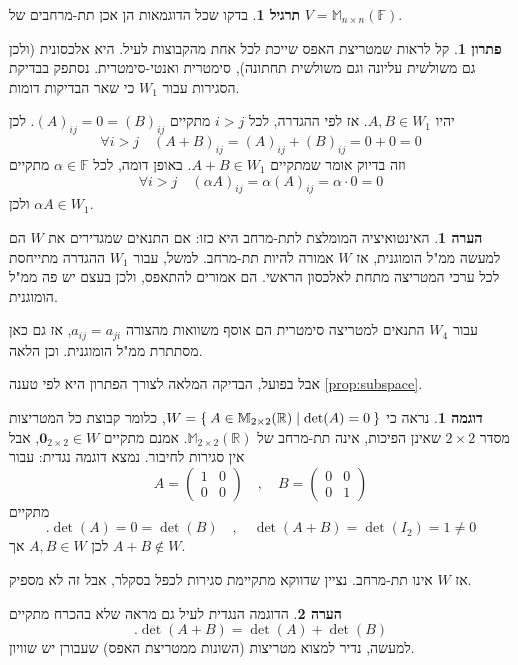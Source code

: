 \documentclass[12pt]{report}
\theoremstyle{plain}
\theoremstyle{definition}
\newtheorem{example}{דוגמה}[chapter]
\newtheorem{exercise}{תרגיל}[chapter]
\newtheorem{remark}{הערה}[chapter]
\newtheorem*{solution}{פתרון}
\newcommand{\R}{\mathbb{R}}
\newcommand{\F}{\mathbb{F}}
\newcommand{\M}{\mathbb{M}}
\newcommand{\0}{\mathbf{0}}
\begin{document}
\begin{exercise}
בדקו שכל הדוגמאות הן אכן תת-מרחבים של 
$V=\M_{n\times n}(\F)$.
\end{exercise}

\begin{solution}
קל לראות שמטריצת האפס שייכת לכל אחת מהקבוצות לעיל. היא אלכסונית (ולכן גם משולשית עליונה וגם משולשית תחתונה), סימטרית ואנטי-סימטרית. נסתפק בבדיקת הסגירות עבור 
$W_1$
כי שאר הבדיקות דומות.

יהיו 
$A,B\in W_1$. 
אז לפי ההגדרה, לכל
$i>j$
מתקיים
$(A)_{ij}=0=(B)_{ij}$.
לכן
$$
\forall i>j \quad (A+B)_{ij}=(A)_{ij}+(B)_{ij}=0+0=0
$$
וזה בדיוק אומר שמתקיים
$A+B\in W_1$.
באופן דומה, לכל 
$\alpha\in\F$
מתקיים
$$
\forall i>j \quad (\alpha A)_{ij}=\alpha(A)_{ij}=\alpha\cdot 0=0
$$
ולכן 
$\alpha A\in W_1$.

\end{solution}

\begin{remark}
האינטואיציה המומלצת לתת-מרחב היא כזו: אם התנאים שמגדירים את 
$W$
הם למעשה ממ"ל הומוגנית, אז 
$W$
אמורה להיות תת-מרחב. למשל, עבור 
$W_1$
ההגדרה מתייחסת לכל ערכי המטריצה מתחת לאלכסון הראשי. הם אמורים להתאפס, ולכן בעצם יש פה ממ"ל הומוגנית.

עבור
$W_4$
התנאים למטריצה סימטרית הם אוסף משוואות מהצורה
$a_{ij}=a_{ji}$,
אז גם כאן מסתתרת ממ"ל הומוגנית. וכן הלאה.

אבל בפועל, הבדיקה המלאה לצורך הפתרון היא לפי טענה
\ref{prop:subspace}.
\end{remark}

\begin{example}
נראה כי
$W=\Set{A\in\M_{2\times 2}(\R)|\det(A)=0}$,
כלומר קבוצת כל המטריצות מסדר 
$2\times 2$
שאינן הפיכות, אינה תת-מרחב של
$\M_{2\times 2}(\R)$.
אמנם מתקיים
$\0_{2\times 2}\in W$,
אבל אין סגירות לחיבור. נמצא דוגמה נגדית: עבור
$$
A=\begin{pmatrix}
1 & 0 \\
0 & 0
\end{pmatrix}\quad,\quad 
B=\begin{pmatrix}
0 & 0 \\
0 & 1
\end{pmatrix}
$$
מתקיים
$$
.\det(A)=0=\det(B)\quad,\quad \det(A+B)=\det(I_2)=1\neq 0
$$
לכן
$A,B\in W$
אך
$A+B\notin W$.

אז 
$W$
אינו תת-מרחב. נציין שדווקא מתקיימת סגירות לכפל בסקלר, אבל זה לא מספיק.
\end{example}

\begin{remark}
הדוגמה הנגדית לעיל גם מראה שלא בהכרח מתקיים
$$
.\det(A+B)=\det(A)+\det(B)
$$
למעשה, נדיר למצוא מטריצות (השונות ממטריצת האפס) שעבורן יש שוויון.
\end{remark}
\end{document}
